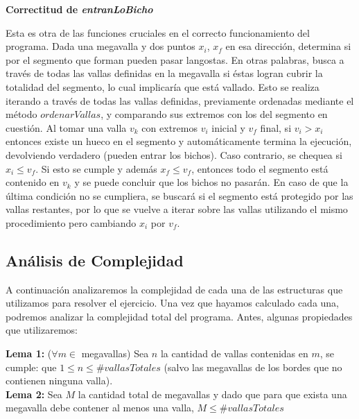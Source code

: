\textbf{Correctitud de \textit{entranLoBicho}}

Esta es otra de las funciones cruciales en el correcto funcionamiento del programa. Dada una megavalla y dos puntos $x_{i}$, $x_{f}$ en esa dirección, determina si por el segmento que forman pueden pasar langostas. En otras palabras, busca a través de todas las vallas definidas en la megavalla si éstas logran cubrir la totalidad del segmento, lo cual implicaría que está vallado. Esto se realiza iterando a través de todas las vallas definidas, previamente ordenadas mediante el método $ordenarVallas$, y comparando sus extremos con los del segmento en cuestión. Al tomar una valla $v_{k}$ con extremos $v_{i}$ inicial y $v_{f}$ final, si $v_{i} > x_{i}$ entonces existe un hueco en el segmento y automáticamente termina la ejecución, devolviendo verdadero (pueden entrar los bichos). Caso contrario, se chequea si $x_{i} \leq v_{f}$. Si esto se cumple y además $x_{f} \leq v_{f}$, entonces todo el segmento está contenido en $v_{k}$ y se puede concluir que los bichos no pasarán. En caso de que la última condición no se cumpliera, se buscará si el segmento está protegido por las vallas restantes, por lo que se vuelve a iterar sobre las vallas utilizando el mismo procedimiento pero cambiando $x_{i}$ por $v_{f}$.


\clearpage

\subsection{Análisis de Complejidad}

\indent A continuación analizaremos la complejidad de cada una de las
estructuras que utilizamos para resolver el ejercicio. Una vez que hayamos
calculado cada una, podremos analizar la complejidad total del programa. Antes, algunas propiedades que utilizaremos:

\begin{flushleft}
\textbf{Lema 1:} ($\forall m \in$ megavallas) Sea $n$ la cantidad de vallas contenidas en $m$, se cumple: que $1 \leq n \leq \#vallasTotales$ (salvo las megavallas de los bordes que no contienen ninguna valla).\\

\textbf{Lema 2:} Sea $M$ la cantidad total de megavallas y dado que para que exista una megavalla debe contener al menos una valla, $M \leq \#vallasTotales$\\
\end{flushleft}

